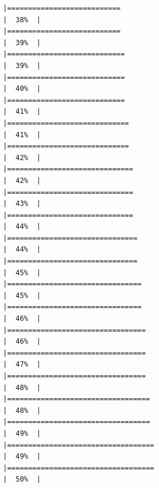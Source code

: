\documentclass[
  english,
  man,a4paper,mask,floatsintext]{apa6}
\begin{document}
\begin{verbatim}
|===========================                                           |  38%  |                                                                              |===========================                                           |  39%  |                                                                              |============================                                          |  39%  |                                                                              |============================                                          |  40%  |                                                                              |============================                                          |  41%  |                                                                              |=============================                                         |  41%  |                                                                              |=============================                                         |  42%  |                                                                              |==============================                                        |  42%  |                                                                              |==============================                                        |  43%  |                                                                              |==============================                                        |  44%  |                                                                              |===============================                                       |  44%  |                                                                              |===============================                                       |  45%  |                                                                              |================================                                      |  45%  |                                                                              |================================                                      |  46%  |                                                                              |=================================                                     |  46%  |                                                                              |=================================                                     |  47%  |                                                                              |=================================                                     |  48%  |                                                                              |==================================                                    |  48%  |                                                                              |==================================                                    |  49%  |                                                                              |===================================                                   |  49%  |                                                                              |===================================                                   |  50%  |                                                                              
\end{verbatim}
\end{document}
